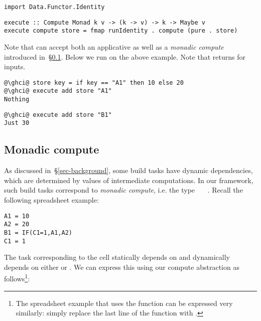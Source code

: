 \vspace{1mm}
\begin{verbatim}
import Data.Functor.Identity
\end{verbatim}
\vspace{0.5mm}
\begin{verbatim}
execute :: Compute Monad k v -> (k -> v) -> k -> Maybe v
execute compute store = fmap runIdentity . compute (pure . store)
\end{verbatim}
\vspace{1mm}

\noindent
Note that  can accept both an applicative as well as a \emph{monadic
compute} introduced in~\S\ref{sec-compute-monad}. Below we run  on
the above  example. Note that  returns  for
inputs.

\vspace{1mm}
\begin{verbatim}
@\ghci@ store key = if key == "A1" then 10 else 20
@\ghci@ execute add store "A1"
Nothing
\end{verbatim}
\begin{verbatim}
@\ghci@ execute add store "B1"
Just 30
\end{verbatim}

\subsection{Monadic compute}\label{sec-compute-monad}

As discussed in~\S\ref{sec-background}, some build tasks have dynamic
dependencies, which are determined by values of intermediate computations. In
our framework, such build tasks correspond to \emph{monadic compute}, i.e.
the type ~~~. Recall the following spreadsheet
example:

\vspace{1mm}
\begin{verbatim}
A1 = 10
A2 = 20
B1 = IF(C1=1,A1,A2)
C1 = 1
\end{verbatim}
\vspace{1mm}

\noindent
The task corresponding to the cell  statically depends on  and
dynamically depends on either  or . We can express this using
our compute abstraction as follows\footnote{The spreadsheet example that uses
the  function can be expressed very similarly: simply replace the
last line of the  function with .}:

